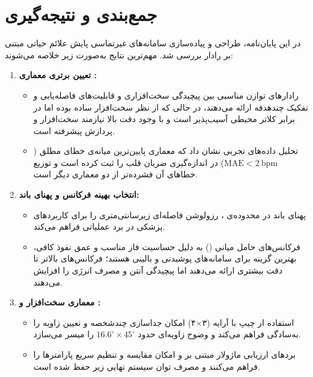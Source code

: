 \section{جمع‌بندی و نتیجه‌گیری}
\label{sec:conclusion}

در این پایان‌نامه، طراحی و پیاده‌سازی سامانه‌های غیرتماسی پایش علائم حیاتی مبتنی بر رادار  بررسی شد. مهم‌ترین نتایج به‌صورت زیر خلاصه می‌شوند:

\begin{enumerate}
    \item \textbf{تعیین برتری معماری :}
    \begin{itemize}
        \item رادارهای  توازن مناسبی بین پیچیدگی سخت‌افزاری و قابلیت‌های فاصله‌یابی و تفکیک چندهدفه ارائه می‌دهند، در حالی که  از نظر سخت‌افزار ساده بوده اما در برابر کلاتر محیطی آسیب‌پذیر است و  با وجود دقت بالا نیازمند سخت‌افزار و پردازش پیشرفته است.
        \item تحلیل داده‌های تجربی نشان داد که معماری  پایین‌ترین میانه‌ی خطای مطلق ($\mathrm{MAE} < 2\ \mathrm{bpm}$) در اندازه‌گیری ضربان قلب را ثبت کرده است و توزیع خطاهای آن فشرده‌تر از دو معماری دیگر است.
    \end{itemize}

    \item \textbf{انتخاب بهینه فرکانس و پهنای باند:}
    \begin{itemize}
        \item پهنای باند در محدوده‌ی ، رزولوشن فاصله‌ای زیرسانتی‌متری را برای کاربردهای پزشکی در برد عملیاتی  فراهم می‌کند.
        \item فرکانس‌های حامل میانی () به دلیل حساسیت فاز مناسب و عمق نفوذ کافی، بهترین گزینه برای سامانه‌های پوشیدنی و بالینی هستند؛ فرکانس‌های بالاتر تا  دقت بیشتری ارائه می‌دهند اما پیچیدگی آنتن و مصرف انرژی را افزایش می‌دهند.
    \end{itemize}

    \item \textbf{معماری سخت‌افزار و :}
    \begin{itemize}
        \item استفاده از چیپ  با آرایه  (۳$\times$۴) امکان جداسازی چندشخصه و تعیین زاویه را به‌سادگی فراهم می‌کند و وضوح زاویه‌ای حدود $16.6^\circ \times 45^\circ$ را میسر می‌سازد.
        \item بردهای ارزیابی ماژولار مبتنی بر  و  امکان مقایسه و تنظیم سریع پارامترها را فراهم می‌کنند و مصرف توان سیستم نهایی زیر  حفظ شده است.
    \end{itemize}


\end{enumerate}
